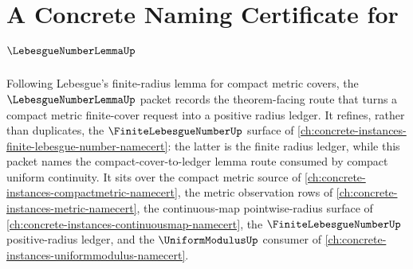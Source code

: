 \chapter{A Concrete Naming Certificate for $\LebesgueNumberLemmaUp$}
\label{ch:concrete-instances-lebesgue-number-lemma-namecert}

Following Lebesgue's finite-radius lemma for compact metric covers, the $\LebesgueNumberLemmaUp$ packet records the theorem-facing route that turns a compact metric finite-cover request into a positive radius ledger. It refines, rather than duplicates, the $\FiniteLebesgueNumberUp$ surface of \autoref{ch:concrete-instances-finite-lebesgue-number-namecert}: the latter is the finite radius ledger, while this packet names the compact-cover-to-ledger lemma route consumed by compact uniform continuity. It sits over the compact metric source of \autoref{ch:concrete-instances-compactmetric-namecert}, the metric observation rows of \autoref{ch:concrete-instances-metric-namecert}, the continuous-map pointwise-radius surface of \autoref{ch:concrete-instances-continuousmap-namecert}, the $\FiniteLebesgueNumberUp$ positive-radius ledger, and the $\UniformModulusUp$ consumer of \autoref{ch:concrete-instances-uniformmodulus-namecert}.

